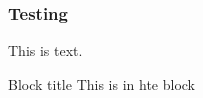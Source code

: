 \begin{frame}
	\frametitle{Testing}
	This is text.
	\begin{block}{Block title}
		This is in hte block
	\end{block}
\end{frame}